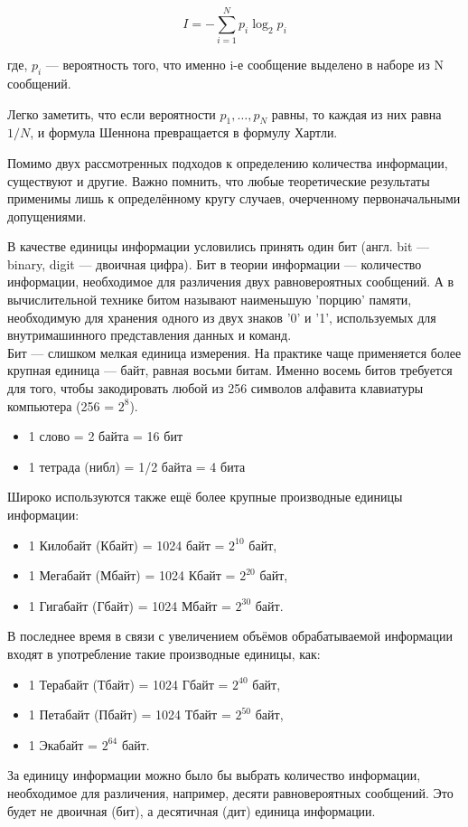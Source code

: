 \documentclass[a4paper]{article}
\begin{document}
\begin{equation}
  I = -\sum_{i=1}^{N}p_{i}\log_{2}p_{i}
\end{equation}

\begin{center}
  где, $p_{i}$ --- вероятность того, что именно i-е сообщение выделено в наборе из N сообщений.
\end{center}

Легко заметить, что если вероятности $p_{1}, \ldots , p_{N}$ равны, то каждая из них равна $1/N$, и формула Шеннона превращается в формулу Хартли.

Помимо двух рассмотренных подходов к определению количества информации, существуют и другие. Важно помнить, что любые теоретические результаты применимы лишь к определённому кругу случаев, очерченному первоначальными допущениями.

В качестве единицы информации условились принять один бит (англ. bit --- binary, digit --- двоичная цифра). Бит в теории информации --- количество информации, необходимое для различения двух равновероятных сообщений. А в вычислительной технике битом называют наименьшую 'порцию' памяти, необходимую для хранения одного из двух знаков '0' и '1', используемых для внутримашинного представления данных и команд.\\
Бит — слишком мелкая единица измерения. На практике чаще применяется более крупная единица — байт, равная восьми битам. Именно восемь битов требуется для того, чтобы закодировать любой из 256 символов алфавита клавиатуры компьютера (256 = $2^{8}$).

\begin{itemize}
  \item 1 слово = 2 байта = 16 бит
  \item 1  тетрада (нибл) = 1/2 байта = 4 бита
\end{itemize}

Широко используются также ещё более крупные производные единицы информации:
\begin{itemize}
  \item 1 Килобайт (Кбайт) = 1024 байт = $2^{10}$ байт,
  \item 1 Мегабайт (Мбайт) = 1024 Кбайт = $2^{20}$ байт,
  \item 1 Гигабайт (Гбайт) = 1024 Мбайт = $2^{30}$ байт.
\end{itemize}

В последнее время в связи с увеличением объёмов обрабатываемой информации входят в употребление такие производные единицы, как:
\begin{itemize}
  \item 1 Терабайт (Тбайт) = 1024 Гбайт = $2^{40}$ байт,
  \item 1 Петабайт (Пбайт) = 1024 Тбайт = $2^{50}$ байт,
  \item 1 Экабайт = $2^{64}$ байт.
\end{itemize}

За единицу информации можно было бы выбрать количество информации, необходимое для различения, например, десяти равновероятных сообщений. Это будет не двоичная (бит), а десятичная (дит) единица информации.
\end{document}
